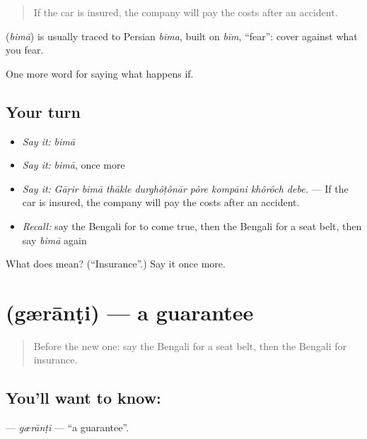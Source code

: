 \begin{quote}
If the car is insured, the company will pay the costs after an accident.
\end{quote}

\begin{cousinweb}
\textbf{} (\emph{bimā}) is usually traced to Persian \emph{bīma}, built on \emph{bīm}, \textquotedblleft{}fear\textquotedblright{}: cover against what you fear.
\end{cousinweb}

\begin{grammarlens}[title={What you've built}]
One more word for saying what happens if.
\end{grammarlens}

\subsection*{Your turn}
\begin{itemize}
\raggedright
  \item \emph{Say it:} \emph{bimā}
  \item \emph{Say it:} \emph{bimā}, once more
  \item \emph{Say it:} \emph{Gāṛir bimā thākle durghôṭônār pôre kompāni khôrôch debe.} — If the car is insured, the company will pay the costs after an accident.
  \item \emph{Recall:} say the Bengali for to come true, then the Bengali for a seat belt, then say \emph{bimā} again
\end{itemize}

\begin{tcolorbox}[breakable,colback=teal!4,colframe=teal!35!black,title={Before you move on}]
What does  mean? (\textquotedblleft{}Insurance\textquotedblright{}.) Say it once more.
\end{tcolorbox}
\section[\texorpdfstring{\bn{গ্যারান্টি} (gærānṭi)}{গ্যারান্টি (gærānṭi)}]{ (gærānṭi) — a guarantee}

\label{lesson:BN-C535-geranti}



\begin{quote}
Before the new one: say the Bengali for a seat belt, then the Bengali for insurance.
\end{quote}

\subsection*{You'll want to know: }
\textbf{} — \emph{gærānṭi} — \textquotedblleft{}a guarantee\textquotedblright{}.

